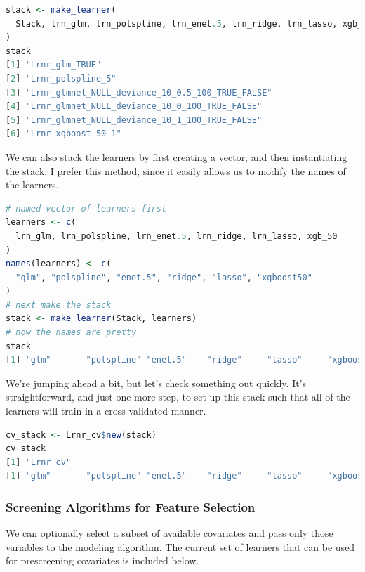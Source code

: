 \documentclass[
  12pt, krantz2,
]{book}
\theoremstyle{definition}
\theoremstyle{definition}
\theoremstyle{definition}
\newcommand{\1}{\mathbbm{1}}
\begin{document}
\begin{lstlisting}[language=R]
stack <- make_learner(
  Stack, lrn_glm, lrn_polspline, lrn_enet.5, lrn_ridge, lrn_lasso, xgb_50
)
stack
[1] "Lrnr_glm_TRUE"                                  
[2] "Lrnr_polspline_5"                               
[3] "Lrnr_glmnet_NULL_deviance_10_0.5_100_TRUE_FALSE"
[4] "Lrnr_glmnet_NULL_deviance_10_0_100_TRUE_FALSE"  
[5] "Lrnr_glmnet_NULL_deviance_10_1_100_TRUE_FALSE"  
[6] "Lrnr_xgboost_50_1"                              
\end{lstlisting}

We can also stack the learners by first creating a vector, and then
instantiating the stack. I prefer this method, since it easily allows us to
modify the names of the learners.

\begin{lstlisting}[language=R]
# named vector of learners first
learners <- c(
  lrn_glm, lrn_polspline, lrn_enet.5, lrn_ridge, lrn_lasso, xgb_50
)
names(learners) <- c(
  "glm", "polspline", "enet.5", "ridge", "lasso", "xgboost50"
)
# next make the stack
stack <- make_learner(Stack, learners)
# now the names are pretty
stack
[1] "glm"       "polspline" "enet.5"    "ridge"     "lasso"     "xgboost50"
\end{lstlisting}

We're jumping ahead a bit, but let's check something out quickly. It's
straightforward, and just one more step, to set up this stack such that
all of the learners will train in a cross-validated manner.

\begin{lstlisting}[language=R]
cv_stack <- Lrnr_cv$new(stack)
cv_stack
[1] "Lrnr_cv"
[1] "glm"       "polspline" "enet.5"    "ridge"     "lasso"     "xgboost50"
\end{lstlisting}

\hypertarget{screening-algorithms-for-feature-selection}{%
\subsubsection*{Screening Algorithms for Feature Selection}\label{screening-algorithms-for-feature-selection}}


We can optionally select a subset of available covariates and pass only
those variables to the modeling algorithm. The current set of learners that
can be used for prescreening covariates is included below.
\end{document}
